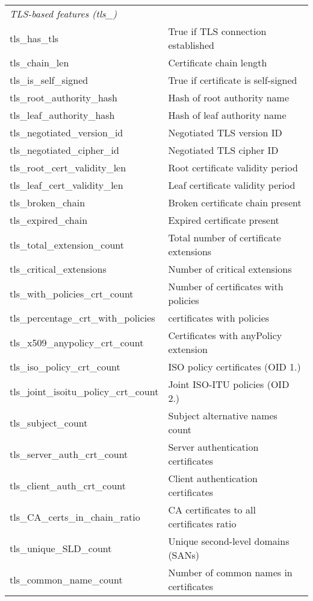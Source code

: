 \begin{longtable}{@{}ll@{}}
\midrule
\multicolumn{2}{l}{\emph{TLS-based features (tls\_)}} \\
tls\_has\_tls & True if TLS connection established \\
tls\_chain\_len & Certificate chain length \\
tls\_is\_self\_signed & True if certificate is self-signed \\
tls\_root\_authority\_hash & Hash of root authority name \\
tls\_leaf\_authority\_hash & Hash of leaf authority name \\
tls\_negotiated\_version\_id & Negotiated TLS version ID \\
tls\_negotiated\_cipher\_id & Negotiated TLS cipher ID \\
tls\_root\_cert\_validity\_len & Root certificate validity period \\
tls\_leaf\_cert\_validity\_len & Leaf certificate validity period \\
tls\_broken\_chain & Broken certificate chain present \\
tls\_expired\_chain & Expired certificate present \\
tls\_total\_extension\_count & Total number of certificate extensions \\
tls\_critical\_extensions & Number of critical extensions \\
tls\_with\_policies\_crt\_count & Number of certificates with policies \\
tls\_percentage\_crt\_with\_policies & certificates with policies \\

tls\_x509\_anypolicy\_crt\_count & Certificates with anyPolicy extension \\
tls\_iso\_policy\_crt\_count & ISO policy certificates (OID 1.\*) \\
tls\_joint\_isoitu\_policy\_crt\_count & Joint ISO-ITU policies (OID 2.\*) \\
tls\_subject\_count & Subject alternative names count \\
tls\_server\_auth\_crt\_count & Server authentication certificates \\
tls\_client\_auth\_crt\_count & Client authentication certificates \\
tls\_CA\_certs\_in\_chain\_ratio & CA certificates to all certificates ratio \\
tls\_unique\_SLD\_count & Unique second-level domains (SANs) \\
tls\_common\_name\_count & Number of common names in certificates \\


\end{longtable}
